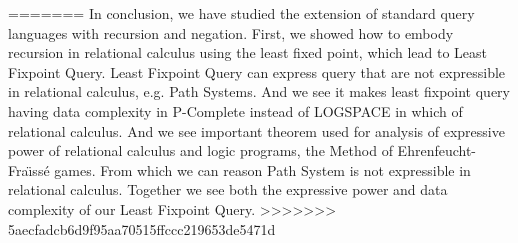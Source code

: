 =======
In conclusion, we have studied the extension of standard query languages with recursion and negation. First, we showed how to embody recursion in relational calculus using the least fixed point, which lead to Least Fixpoint Query. Least Fixpoint Query can express query that are not expressible in relational calculus, e.g.  Path Systems. And we see it makes least fixpoint query having data complexity in P-Complete instead of LOGSPACE in which of relational calculus. And we see important theorem used for analysis of expressive power of relational calculus and logic programs, the Method of Ehrenfeucht-Fra\"ıss\'e games. From which we can reason Path System is not expressible in relational calculus. Together we see both the expressive power and data complexity of our Least Fixpoint Query. 
>>>>>>> 5aecfadcb6d9f95aa70515ffccc219653de5471d
